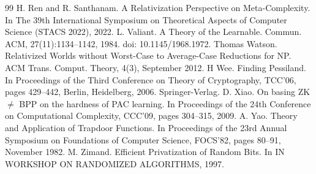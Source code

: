 \documentclass[10pt,a4paper]{article}
\begin{document}
\begin{thebibliography}{99}
 H. Ren and R. Santhanam. A Relativization Perspective on Meta-Complexity. In The 39th International Symposium on Theoretical Aspects of Computer Science (STACS 2022), 2022.
 L. Valiant. A Theory of the Learnable. Commun. ACM, 27(11):1134–1142, 1984. doi: 10.1145/1968.1972.
 Thomas Watson. Relativized Worlds without Worst-Case to Average-Case Reductions for NP. ACM Trans. Comput. Theory, 4(3), September 2012.
 H Wee. Finding Pessiland. In Proceedings of the Third Conference on Theory of Cryptography, TCC’06, pages 429–442, Berlin, Heidelberg, 2006. Springer-Verlag.
 D. Xiao. On basing ZK $\neq$ BPP on the hardness of PAC learning. In Proceedings of the 24th Conference on Computational Complexity, CCC’09, pages 304–315, 2009.
 A. Yao. Theory and Application of Trapdoor Functions. In Proceedings of the 23rd Annual Symposium on Foundations of Computer Science, FOCS’82, pages 80–91, November 1982.
 M. Zimand. Efficient Privatization of Random Bits. In IN WORKSHOP ON RANDOMIZED ALGORITHMS, 1997.
\end{thebibliography}
\end{document}
